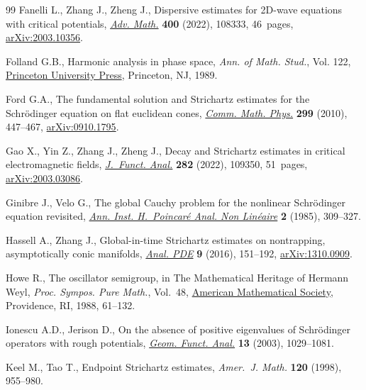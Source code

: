 \documentclass[10pt,a4paper]{amsart}
\numberwithin{equation}{section}
\begin{document}
\begin{thebibliography}{99}
Fanelli L., Zhang J., Zheng J., Dispersive estimates for 2{D}-wave equations
 with critical potentials, \href{https://doi.org/10.1016/j.aim.2022.108333}{\textit{Adv. Math.}} \textbf{400} (2022), 108333,
 46~pages, \href{https://arxiv.org/abs/2003.10356}{arXiv:2003.10356}.

Folland G.B., Harmonic analysis in phase space, \textit{Ann. of Math. Stud.},
 Vol. 122, \href{https://doi.org/10.1515/9781400882427}{Princeton University Press}, Princeton, NJ, 1989.

Ford G.A., The fundamental solution and {S}trichartz estimates for the
 {S}chr\"odinger equation on flat euclidean cones, \href{https://doi.org/10.1007/s00220-010-1050-7}{\textit{Comm. Math. Phys.}}
 \textbf{299} (2010), 447--467, \href{https://arxiv.org/abs/0910.1795}{arXiv:0910.1795}.

Gao X., Yin Z., Zhang J., Zheng J., Decay and {S}trichartz estimates in
 critical electromagnetic fields, \href{https://doi.org/10.1016/j.jfa.2021.109350}{\textit{J.~Funct. Anal.}} \textbf{282}
 (2022), 109350, 51~pages, \href{https://arxiv.org/abs/2003.03086}{arXiv:2003.03086}.

Ginibre J., Velo G., The global {C}auchy problem for the nonlinear
 {S}chr\"odinger equation revisited, \href{https://doi.org/10.1016/S0294-1449(16)30399-7}{\textit{Ann. Inst. H.~Poincar\'e Anal.
 Non Lin\'eaire}} \textbf{2} (1985), 309--327.

Hassell A., Zhang J., Global-in-time {S}trichartz estimates on nontrapping,
 asymptotically conic manifolds, \href{https://doi.org/10.2140/apde.2016.9.151}{\textit{Anal. PDE}} \textbf{9} (2016),
 151--192, \href{https://arxiv.org/abs/1310.0909}{arXiv:1310.0909}.

Howe R., The oscillator semigroup, in The {M}athematical {H}eritage of
 {H}ermann {W}eyl, \textit{Proc. Sympos. Pure Math.}, Vol.~48, \href{https://doi.org/10.1090/pspum/048/974332}{American
 Mathematical Society}, Providence, RI, 1988, 61--132.

Ionescu A.D., Jerison D., On the absence of positive eigenvalues of
 {S}chr\"odinger operators with rough potentials, \href{https://doi.org/10.1007/s00039-003-0439-2}{\textit{Geom. Funct. Anal.}}
 \textbf{13} (2003), 1029--1081.

Keel M., Tao T., Endpoint {S}trichartz estimates, \textit{Amer.~J. Math.}
 \textbf{120} (1998), 955--980.


\end{thebibliography}
\end{document}
